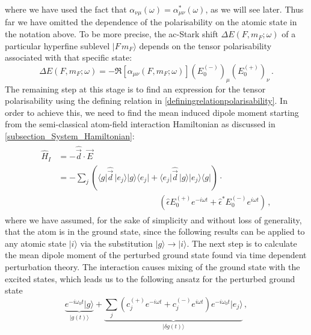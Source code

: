 \documentclass[../Thesis-IJspeert.tex]{subfiles}
\begin{document}
where we have used the fact that $\alpha_{\nu \mu}(\omega) = \alpha_{\mu \nu}^*(\omega)$, as we will see later. Thus far we have omitted the dependence of the polarisability on the atomic state in the notation above. To be more precise, the ac-Stark shift $\Delta E(F,m_F;\omega)$ of a particular hyperfine sublevel $\vert F\,m_F \rangle$ depends on the tensor polarisability associated with that specific state:
\begin{equation}
\label{StarkSummary}
	 \Delta E(F,m_F;\omega)=-\Re [ \alpha_{\mu \nu}(F,m_F;\omega) ] ( E_0^{(-)} )_\mu ( E_0^{(+)} )_\nu\,.
\end{equation}
The remaining step at this stage is to find an expression for the tensor polarisability using the defining relation in \autoref{definingrelationpolarisability}. In order to achieve this, we need to find the mean induced dipole moment starting from the semi-classical atom-field interaction Hamiltonian as discussed in \autoref{subsection_System_Hamiltonian}:
\begin{align}
\begin{split}
	\hat{H}_I &= -\hat{\vec{d}} \cdot \vec{E} \\ &=-\sum_{j} \left( \langle g \vert \hat{\vec{d}}\, \vert e_j \rangle \vert g \rangle \langle e_j \vert +  \langle e_j \vert \hat{\vec{d}}\, \vert g \rangle \vert e_j \rangle \langle g \vert \right) \cdot \\ &\hspace{12em} \left( \hat{\epsilon}E_0^{(+)} e^{-i\omega t} + \hat{\epsilon}^*E_0^{(-)} e^{i\omega t} \right) \,,
\end{split}
\end{align}
where we have assumed, for the sake of simplicity and without loss of generality, that the atom is in the ground state, since the following results can be applied to any atomic state $\vert i \rangle$ via the substitution $\vert g \rangle \rightarrow \vert i \rangle$. The next step is to calculate the mean dipole moment of the perturbed ground state found via time dependent perturbation theory. The interaction causes mixing of the ground state with the excited states, which leads us to the following ansatz for the perturbed ground state
\begin{equation}
\label{ansatzgroundstate}
	\underbrace{e^{-i\omega_0 t} \vert g \rangle}_{\vert g(t) \rangle} + \underbrace{\sum_j \left( c_j^{(+)} e^{-i\omega t} + c_j^{(-)} e^{i\omega t} \right) e^{-i\omega_0 t} \vert e_j \rangle }_{\vert \delta g (t) \rangle} \,,
\end{equation}
\end{document}
